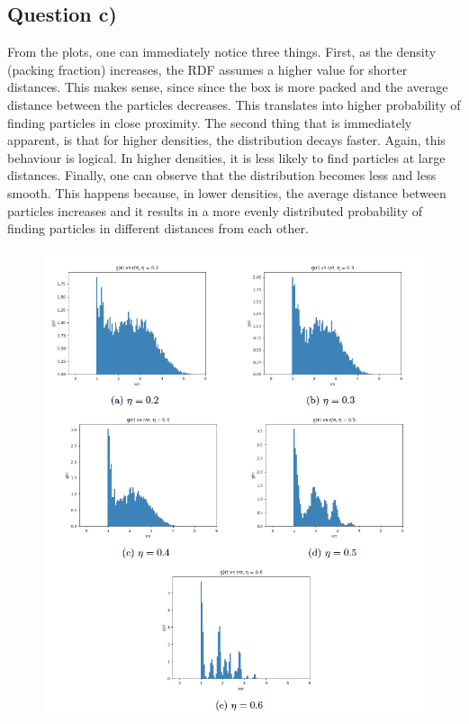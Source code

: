 \documentclass[11pt]{report}
\begin{document}
\subsection*{Question c)}

From the plots, one can immediately notice three things. First, as the density (packing fraction) increases, the RDF assumes a higher value for shorter distances. This makes sense, since since the box is more packed and the average distance between the particles decreases. This translates into higher probability of finding particles in close proximity. The second thing that is immediately apparent, is that for higher densities, the distribution decays faster. Again, this behaviour is logical. In higher densities, it is less likely to find particles at large distances. Finally, one can observe that the distribution becomes less and less smooth. This happens because, in lower densities, the average distance between particles increases and it results in a more evenly distributed probability of finding particles in different distances from each other.

\begin{figure}[ht!]
     \centering
     \includegraphics{pc_NVT.png}

\end{figure}
\end{document}
